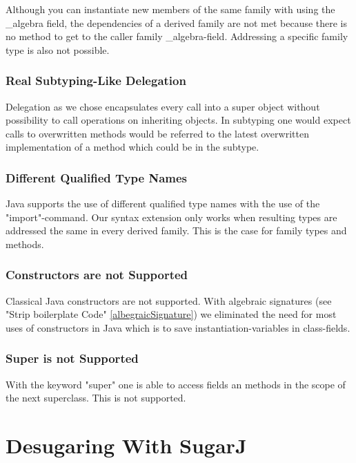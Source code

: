 \documentclass{report}
\begin{document}
Although you can instantiate new members of the same family with using the \_algebra field, the dependencies of a derived family are not met because there is no method to get to the caller family \_algebra-field.
Addressing a specific family type is also not possible.

\subsection{Real Subtyping-Like Delegation}

Delegation as we chose encapsulates every call into a super object without possibility to call operations on inheriting objects. In subtyping one would expect calls to overwritten methods would be referred to the latest overwritten implementation of a method which could be in the subtype.

\subsection{Different Qualified Type Names}

Java supports the use of different qualified type names with the use of the "import"-command. Our syntax extension only works when resulting types are addressed the same in every derived family. This is the case for family types and methods.

\subsection{Constructors are not Supported}

Classical Java constructors are not supported. With algebraic signatures (see "Strip boilerplate Code" \ref{albegraicSignature}) we eliminated the need for most uses of constructors in Java which is to save instantiation-variables in class-fields.

\subsection{Super is not Supported}

With the keyword "super" one is able to access fields an methods in the scope of the next superclass. This is not supported.

\chapter{Desugaring With SugarJ}
\label{sugarJChapter}
\end{document}
